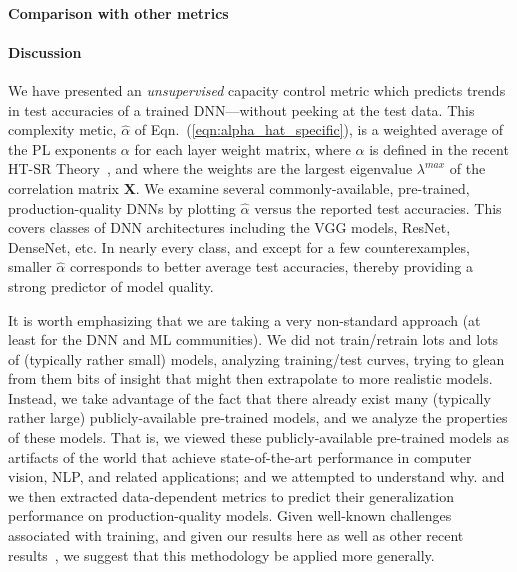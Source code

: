 \paragraph{Comparison with other metrics}

\paragraph{Discussion}

We have presented an \emph{unsupervised} capacity control metric which predicts trends in test accuracies of a trained DNN---without peeking at the test data. 
This complexity metic, $\hat{\alpha}$ of Eqn.~(\ref{eqn:alpha_hat_specific}), is a weighted average of the PL exponents $\alpha$ for each layer weight matrix, where $\alpha$ is defined in the recent HT-SR Theory~\cite{MM18_TR}, and where the weights are the largest eigenvalue $\lambda^{max}$ of the correlation matrix $\mathbf{X}$.  
%
We examine several commonly-available, pre-trained, production-quality DNNs by plotting $\hat{\alpha}$ versus the reported test accuracies.
This covers classes of DNN architectures including the VGG models, ResNet, DenseNet, etc. 
In nearly every class, and except for a few counterexamples, smaller $\hat{\alpha}$ corresponds to better average test accuracies, thereby providing a strong predictor of model quality.

 It is worth emphasizing that 
we are taking a very non-standard approach (at least for the DNN and ML communities).
We did not train/retrain lots and lots of (typically rather small) models, analyzing training/test curves, trying to glean from them bits of insight that might then extrapolate to more realistic models.
Instead, we take advantage of the fact that there already exist many (typically rather large) publicly-available pre-trained models, and we analyze the properties of these models.
That is, we viewed these publicly-available pre-trained models as artifacts of the world that achieve state-of-the-art performance in computer vision, NLP, and related applications; and we attempted to understand why.
and we then extracted data-dependent metrics to predict their generalization performance on production-quality models.
Given well-known challenges associated with training, and given our results here as well as other recent results~\cite{MM18_TR},
we suggest that this methodology be applied more generally.

